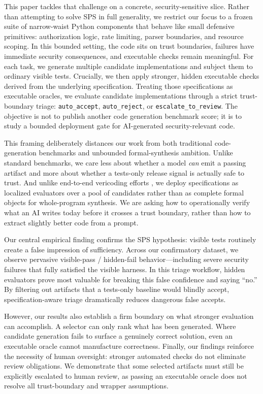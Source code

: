 \documentclass[11pt]{article}
\begin{document}
This paper tackles that challenge on a concrete, security-sensitive slice. Rather than attempting to solve SPS in full generality, we restrict our focus to a frozen suite of narrow-waist Python components that behave like small defensive primitives: authorization logic, rate limiting, parser boundaries, and resource scoping. In this bounded setting, the code sits on trust boundaries, failures have immediate security consequences, and executable checks remain meaningful. For each task, we generate multiple candidate implementations and subject them to ordinary visible tests. Crucially, we then apply stronger, hidden executable checks derived from the underlying specification. Treating those specifications as executable oracles, we evaluate candidate implementations through a strict trust-boundary triage: \texttt{auto\_accept}, \texttt{auto\_reject}, or \texttt{escalate\_to\_review}. The objective is not to publish another code generation benchmark score; it is to study a bounded deployment gate for AI-generated security-relevant code.

This framing deliberately distances our work from both traditional code-generation benchmarks and unbounded formal-synthesis ambition. Unlike standard benchmarks, we care less about whether a model \emph{can} emit a passing artifact and more about whether a tests-only release signal is actually safe to trust. And unlike end-to-end vericoding efforts \cite{Bursuc2025Vericoding}, we deploy specifications as localized evaluators over a pool of candidates rather than as complete formal objects for whole-program synthesis. We are asking how to operationally verify what an AI writes today before it crosses a trust boundary, rather than how to extract slightly better code from a prompt.

Our central empirical finding confirms the SPS hypothesis: visible tests routinely create a false impression of sufficiency. Across our confirmatory dataset, we observe pervasive visible-pass / hidden-fail behavior---including severe security failures that fully satisfied the visible harness. In this triage workflow, hidden evaluators prove most valuable for breaking this false confidence and saying ``no.'' By filtering out artifacts that a tests-only baseline would blindly accept, specification-aware triage dramatically reduces dangerous false accepts. 

However, our results also establish a firm boundary on what stronger evaluation can accomplish. A selector can only rank what has been generated. Where candidate generation fails to surface a genuinely correct solution, even an executable oracle cannot manufacture correctness. Finally, our findings reinforce the necessity of human oversight: stronger automated checks do not eliminate review obligations. We demonstrate that some selected artifacts must still be explicitly escalated to human review, as passing an executable oracle does not resolve all trust-boundary and wrapper assumptions.
\end{document}
